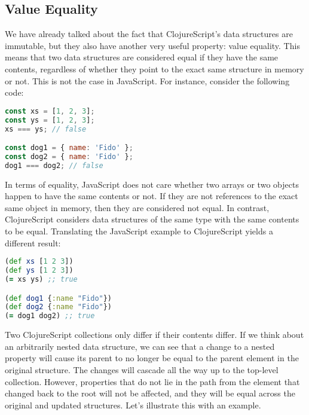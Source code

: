 \documentclass[10pt,twoside,openright]{memoir}
\begin{document}
\subsection{Value Equality}

We have already talked about the fact that ClojureScript's data
structures are immutable, but they also have another very useful
property: value equality. This means that two data structures are
considered equal if they have the same contents, regardless of whether
they point to the exact same structure in memory or not. This is not the
case in JavaScript. For instance, consider the following code:

\begin{lstlisting}[language=JavaScript]
const xs = [1, 2, 3];
const ys = [1, 2, 3];
xs === ys; // false

const dog1 = { name: 'Fido' };
const dog2 = { name: 'Fido' };
dog1 === dog2; // false
\end{lstlisting}

In terms of equality, JavaScript does not care whether two arrays or two
objects happen to have the same contents or not. If they are not
references to the exact same object in memory, then they are considered
not equal. In contrast, ClojureScript considers data structures of the
same type with the same contents to be equal. Translating the JavaScript
example to ClojureScript yields a different result:

\begin{lstlisting}[language=Clojure]
(def xs [1 2 3])
(def ys [1 2 3])
(= xs ys) ;; true

(def dog1 {:name "Fido"})
(def dog2 {:name "Fido"})
(= dog1 dog2) ;; true
\end{lstlisting}

Two ClojureScript collections only differ if their contents differ. If
we think about an arbitrarily nested data structure, we can see that a
change to a nested property will cause its parent to no longer be equal
to the parent element in the original structure. The changes will
cascade all the way up to the top-level collection. However, properties
that do not lie in the path from the element that changed back to the
root will not be affected, and they will be equal across the original
and updated structures. Let's illustrate this with an example.
\end{document}
